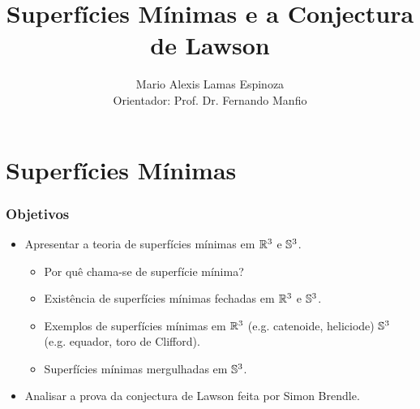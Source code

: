 \documentclass[12pt,a4paper]{beamer}
\author{Mario Alexis Lamas Espinoza \\ Orientador: Prof. Dr. Fernando Manfio}
\title{Superfícies Mínimas e a Conjectura de Lawson}
\institute[ICMC]{Instituto de Ciências Matemáticas e de Computação}
\theoremstyle{definition}
\begin{document}
\begin{frame}
	\maketitle	
\end{frame}

\section{Superfícies Mínimas}

\begin{frame}
	\frametitle{Objetivos}
	
	\begin{itemize}
		\item Apresentar a teoria de superfícies mínimas em $\mathbb R^3$ e $\mathbb{S}^3$.
		\begin{itemize}
			\item Por quê chama-se de superfície mínima?
			\item Existência de superfícies mínimas fechadas em $\mathbb R^3$ e $\mathbb{S}^3$.
			\item Exemplos de superfícies mínimas em $\mathbb R^3$ (e.g. catenoide, heliciode) $\mathbb{S}^3$ (e.g. equador, toro de Clifford).
			\item Superfícies mínimas mergulhadas em $\mathbb{S}^3$.
		\end{itemize}
		\item Analisar a prova da conjectura de Lawson feita por Simon Brendle.
	\end{itemize}
\end{frame}
\end{document}
